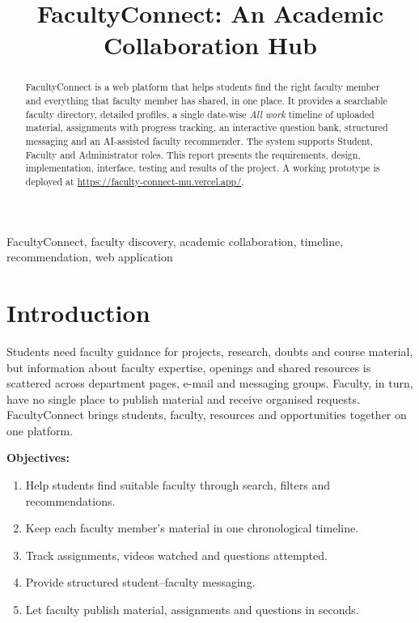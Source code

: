 \documentclass[conference]{IEEEtran}
\begin{document}
\title{FacultyConnect: An Academic Collaboration Hub}

\author{
\and
{}
\and
{}
}

\maketitle

\begin{abstract}
FacultyConnect is a web platform that helps students find the right faculty member and everything that faculty member has shared, in one place. It provides a searchable faculty directory, detailed profiles, a single date-wise \emph{All work} timeline of uploaded material, assignments with progress tracking, an interactive question bank, structured messaging and an AI-assisted faculty recommender. The system supports Student, Faculty and Administrator roles. This report presents the requirements, design, implementation, interface, testing and results of the project. A working prototype is deployed at \url{https://faculty-connect-mu.vercel.app/}.
\end{abstract}

\begin{IEEEkeywords}
FacultyConnect, faculty discovery, academic collaboration, timeline, recommendation, web application
\end{IEEEkeywords}

\section{Introduction}
Students need faculty guidance for projects, research, doubts and course material, but information about faculty expertise, openings and shared resources is scattered across department pages, e-mail and messaging groups. Faculty, in turn, have no single place to publish material and receive organised requests. FacultyConnect brings students, faculty, resources and opportunities together on one platform.

\textbf{Objectives:}
\begin{enumerate}
  \item Help students find suitable faculty through search, filters and recommendations.
  \item Keep each faculty member's material in one chronological timeline.
  \item Track assignments, videos watched and questions attempted.
  \item Provide structured student--faculty messaging.
  \item Let faculty publish material, assignments and questions in seconds.
\end{enumerate}
\end{document}
